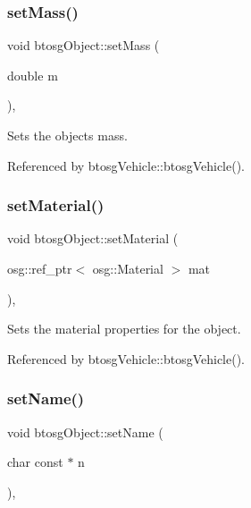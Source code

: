 \subsubsection{\texorpdfstring{set\+Mass()}{setMass()}}
{\footnotesize\ttfamily void btosg\+Object\+::set\+Mass (\begin{DoxyParamCaption}\item[{double}]{m }\end{DoxyParamCaption})\hspace{0.3cm}{\ttfamily [inline]}, {\ttfamily [inherited]}}

Sets the object\textquotesingle{}s mass. 

Referenced by btosg\+Vehicle\+::btosg\+Vehicle().

\mbox{\label{classbtosgObject_a6ab7b9e0553dab398b980637788b56a8}} 
\subsubsection{\texorpdfstring{set\+Material()}{setMaterial()}}
{\footnotesize\ttfamily void btosg\+Object\+::set\+Material (\begin{DoxyParamCaption}\item[{osg\+::ref\+\_\+ptr$<$ osg\+::\+Material $>$}]{mat }\end{DoxyParamCaption})\hspace{0.3cm}{\ttfamily [inline]}, {\ttfamily [inherited]}}

Sets the material properties for the object. 

Referenced by btosg\+Vehicle\+::btosg\+Vehicle().

\mbox{\label{classbtosgObject_ab06a1b3f357209214c6440cd5746523e}} 
\subsubsection{\texorpdfstring{set\+Name()}{setName()}}
{\footnotesize\ttfamily void btosg\+Object\+::set\+Name (\begin{DoxyParamCaption}\item[{char const $\ast$}]{n }\end{DoxyParamCaption})\hspace{0.3cm}{\ttfamily [inline]}, {\ttfamily [inherited]}}


